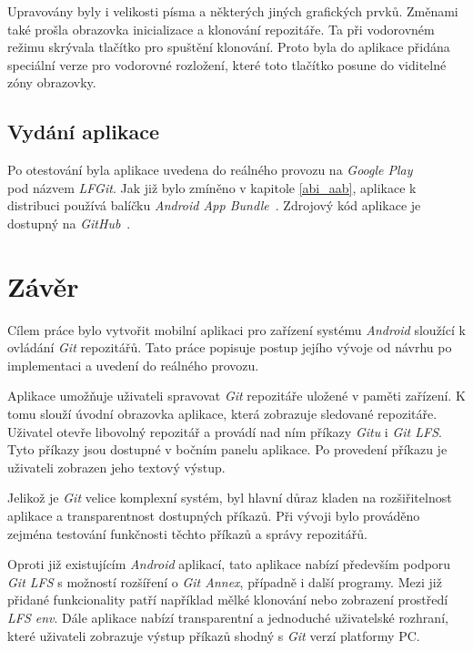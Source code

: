 Upravovány byly i velikosti písma a některých jiných grafických prvků. Změnami také prošla obrazovka inicializace a klonování repozitáře. Ta při vodorovném režimu skrývala tlačítko pro spuštění klonování. Proto byla do aplikace přidána speciální verze pro vodorovné rozložení, které toto tlačítko posune do viditelné zóny obrazovky.

\section{Vydání aplikace}
Po otestování byla aplikace uvedena do reálného provozu na \emph{Google Play}\\ pod názvem \emph{LFGit}. Jak již bylo zmíněno v kapitole \ref{abi_aab}, aplikace k distribuci používá balíčku \emph{Android App Bundle}~. Zdrojový kód aplikace je dostupný na \emph{GitHub}~.

\chapter{Závěr}
Cílem práce bylo vytvořit mobilní aplikaci pro zařízení systému \emph{Android} sloužící k ovládání \emph{Git} repozitářů. Tato práce popisuje postup jejího vývoje od návrhu po implementaci a uvedení do reálného provozu.

Aplikace umožňuje uživateli spravovat \emph{Git} repozitáře uložené v paměti zařízení. K tomu slouží úvodní obrazovka aplikace, která zobrazuje sledované repozitáře. Uživatel otevře libovolný repozitář a provádí nad ním příkazy \emph{Gitu} i \emph{Git LFS}. Tyto příkazy jsou dostupné v bočním panelu aplikace. Po provedení příkazu je uživateli zobrazen jeho textový výstup.

Jelikož je \emph{Git} velice komplexní systém, byl hlavní důraz kladen na rozšiřitelnost aplikace a transparentnost dostupných příkazů. Při vývoji bylo prováděno zejména testování funkčnosti těchto příkazů a správy repozitářů.

Oproti již existujícím \emph{Android} aplikací, tato aplikace nabízí především podporu \emph{Git LFS} s možností rozšíření o \emph{Git Annex}, případně i další programy. Mezi již přidané funkcionality patří například mělké klonování nebo zobrazení prostředí \emph{LFS env}. Dále aplikace nabízí transparentní a jednoduché uživatelské rozhraní, které uživateli zobrazuje výstup příkazů shodný s \emph{Git} verzí platformy PC.

